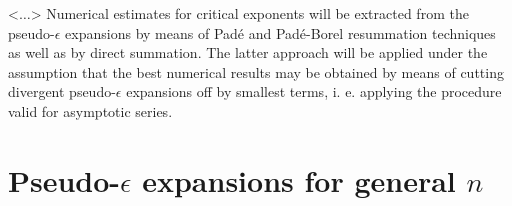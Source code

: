 \documentclass[aps,prb,preprint,showpacs,preprintnumbers,amsmath,amssymb]{revtex4}
\newcommand{\comment}[1]{} %
\begin{document}
<$\dots$>
\comment{
In this paper, we study the critical behavior of two-dimensional $O(n)$-symmetric
systems within the frame of pseudo-$\epsilon$ expansion technique. The series for
the Wilson fixed point location $g*$ and critical exponents originating from the
five-loop RG expansions will be derived for arbitrary order parameter
dimensionality $n$. The pseudo-$\epsilon$ expansions obtained will be analysed in
detail for $n = 1$, $n = 0$ and $n = -1$, i. e. for the cases corresponding to
physically realizable systems with exactly known critical exponents \cite{N1982,
N1984, FQS1984}. These systems may be considered as testbeds for clarification of
the numerical effectiveness of various approximation schemes including RG
perturbation theory and the method of pseudo-$\epsilon$ expansion.} Numerical
estimates for critical exponents will be extracted from the pseudo-$\epsilon$
expansions by means of Pad\'e and Pad\'e-Borel resummation techniques as well as
by direct summation. The latter approach will be applied under the assumption
that the best numerical results may be obtained by means of cutting divergent
pseudo-$\epsilon$ expansions off by smallest terms, i. e. applying the procedure
valid for asymptotic series.

\section{Pseudo-$\epsilon$ expansions for general $n$}
\end{document}
